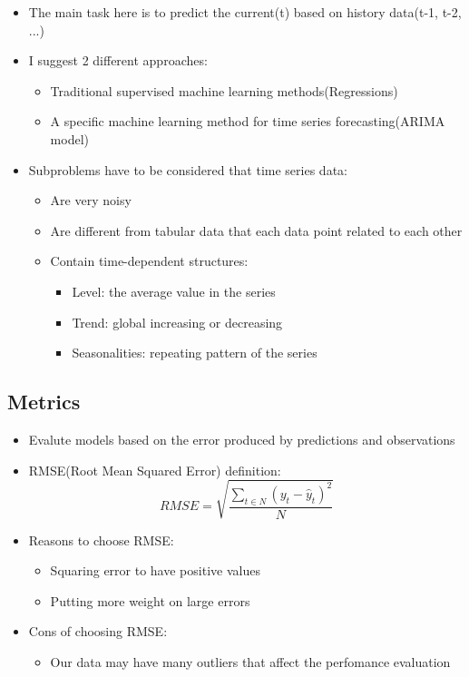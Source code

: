 \documentclass[11pt]{article}
\providecommand{\tightlist}{%
      \setlength{\itemsep}{0pt}\setlength{\parskip}{0pt}}
\begin{document}
\begin{itemize}
\tightlist
\item
  The main task here is to predict the current(t) based on history
  data(t-1, t-2, ...)
\item
  I suggest 2 different approaches:

  \begin{itemize}
  \tightlist
  \item
    Traditional supervised machine learning methods(Regressions)
  \item
    A specific machine learning method for time series forecasting(ARIMA
    model)
  \end{itemize}
\item
  Subproblems have to be considered that time series data:

  \begin{itemize}
  \tightlist
  \item
    Are very noisy
  \item
    Are different from tabular data that each data point related to each
    other
  \item
    Contain time-dependent structures:

    \begin{itemize}
    \tightlist
    \item
      Level: the average value in the series
    \item
      Trend: global increasing or decreasing
    \item
      Seasonalities: repeating pattern of the series
    \end{itemize}
  \end{itemize}
\end{itemize}

\subsection{Metrics}\label{metrics}

\begin{itemize}
\tightlist
\item
  Evalute models based on the error produced by predictions and
  observations
\item
  RMSE(Root Mean Squared Error) definition:
  \[RMSE = \sqrt{\frac{\sum_{t \in N}(y_t - \hat{y}_t)^2}{N}}\]
\item
  Reasons to choose RMSE:

  \begin{itemize}
  \tightlist
  \item
    Squaring error to have positive values
  \item
    Putting more weight on large errors
  \end{itemize}
\item
  Cons of choosing RMSE:

  \begin{itemize}
  \tightlist
  \item
    Our data may have many outliers that affect the perfomance
    evaluation
  \end{itemize}
\end{itemize}
\end{document}
